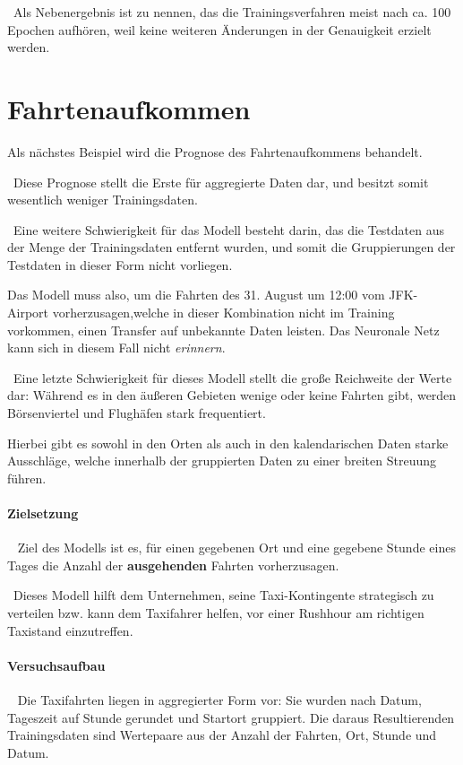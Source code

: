 ~\newline Als Nebenergebnis ist zu nennen, das die Trainingsverfahren meist nach ca. 100 Epochen aufhören, weil keine weiteren Änderungen in der Genauigkeit erzielt werden.
\newpage
\section{Fahrtenaufkommen}
\label{sec:RidesPred}
Als nächstes Beispiel wird die Prognose des Fahrtenaufkommens behandelt. 

~\newline Diese Prognose stellt die Erste für aggregierte Daten dar, und besitzt somit wesentlich weniger Trainingsdaten.

~\newline Eine weitere Schwierigkeit für das Modell besteht darin, das die Testdaten aus der Menge der Trainingsdaten entfernt wurden, und somit die Gruppierungen der Testdaten in dieser Form nicht vorliegen. 

Das Modell muss also, um die Fahrten des 31. August um 12:00 vom JFK-Airport vorherzusagen,welche in dieser Kombination nicht im Training vorkommen, einen Transfer auf unbekannte Daten leisten. Das Neuronale Netz kann sich in diesem Fall nicht \textit{erinnern}.

~\newline Eine letzte Schwierigkeit für dieses Modell stellt die große Reichweite der Werte dar: Während es in den äußeren Gebieten wenige oder keine Fahrten gibt, werden Börsenviertel und Flughäfen stark frequentiert. 

Hierbei gibt es sowohl in den Orten als auch in den kalendarischen Daten starke Ausschläge, welche innerhalb der gruppierten Daten zu einer breiten Streuung führen.
\paragraph{Zielsetzung} ~\newline
Ziel des Modells ist es, für einen gegebenen Ort und eine gegebene Stunde eines Tages die Anzahl der \textbf{ausgehenden} Fahrten vorherzusagen. 

~\newline Dieses Modell hilft dem Unternehmen, seine Taxi-Kontingente strategisch zu verteilen bzw. kann dem Taxifahrer helfen, vor einer Rushhour am richtigen Taxistand einzutreffen. 
\paragraph{Versuchsaufbau} ~\newline
Die Taxifahrten liegen in aggregierter Form vor: Sie wurden nach Datum, Tageszeit auf Stunde gerundet und Startort gruppiert. Die daraus Resultierenden Trainingsdaten sind Wertepaare aus der Anzahl der Fahrten, Ort, Stunde und Datum. 

